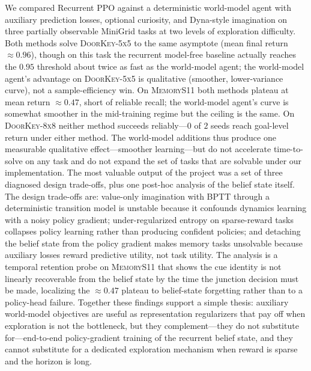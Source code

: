\documentclass[letterpaper]{article}
\begin{document}
We compared Recurrent PPO against a deterministic world-model agent with
auxiliary prediction losses, optional curiosity, and Dyna-style
imagination on three partially observable MiniGrid tasks at two levels of
exploration difficulty. Both methods solve \textsc{DoorKey-5x5} to the
same asymptote (mean final return $\approx 0.96$), though on this task
the recurrent model-free baseline actually reaches the $0.95$ threshold
about twice as fast as the world-model agent; the world-model agent's
advantage on \textsc{DoorKey-5x5} is qualitative (smoother, lower-variance
curve), not a sample-efficiency win. On \textsc{MemoryS11} both methods
plateau at mean return $\approx 0.47$, short of reliable recall; the
world-model agent's curve is somewhat smoother in the mid-training
regime but the ceiling is the same. On \textsc{DoorKey-8x8} neither
method succeeds reliably---$0$ of $2$ seeds reach goal-level return
under either method. The world-model additions thus produce one
measurable qualitative effect---smoother learning---but do not accelerate
time-to-solve on any task and do not expand the set of tasks that are
solvable under our implementation. The most valuable
output of the project was a set of three diagnosed design trade-offs,
plus one post-hoc analysis of the belief state itself. The design
trade-offs are: value-only imagination with BPTT through a deterministic
transition model is unstable because it confounds dynamics learning with
a noisy policy gradient; under-regularized entropy on sparse-reward tasks
collapses policy learning rather than producing confident policies; and
detaching the belief state from the policy gradient makes memory tasks
unsolvable because auxiliary losses reward predictive utility, not task
utility. The analysis is a temporal retention probe on \textsc{MemoryS11}
that shows the cue identity is not linearly recoverable from the belief
state by the time the junction decision must be made, localizing the
$\approx 0.47$ plateau to belief-state forgetting rather than to a policy-head
failure.
Together these findings support a simple thesis: auxiliary world-model
objectives are useful as representation regularizers that pay off when
exploration is not the bottleneck, but they complement---they do not
substitute for---end-to-end policy-gradient training of the recurrent
belief state, and they cannot substitute for a dedicated exploration
mechanism when reward is sparse and the horizon is long.


\end{document}
